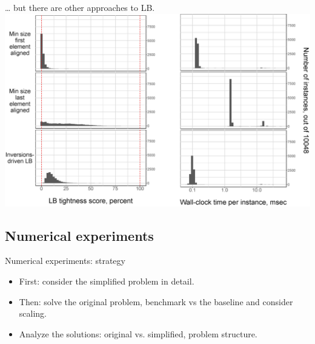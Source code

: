 \documentclass[10pt, xcolor=svgnames]{beamer}
\begin{document}
\begin{frame}[label={sec:org36cc50f}]{\ldots{} but there are other approaches to LB.}
\includegraphics[width=\textwidth]{./img/LB.eps}
\end{frame}
\subsection{Numerical experiments}
\label{sec:org99583c9}
\begin{frame}[label={sec:org5343e77}]{Numerical experiments: strategy}
\begin{itemize}
\item First: consider the simplified problem in detail.
\item Then: solve the original problem, benchmark vs the baseline and consider scaling.
\item Analyze the solutions: original vs. simplified, problem structure.
\end{itemize}
\end{frame}
\end{document}
